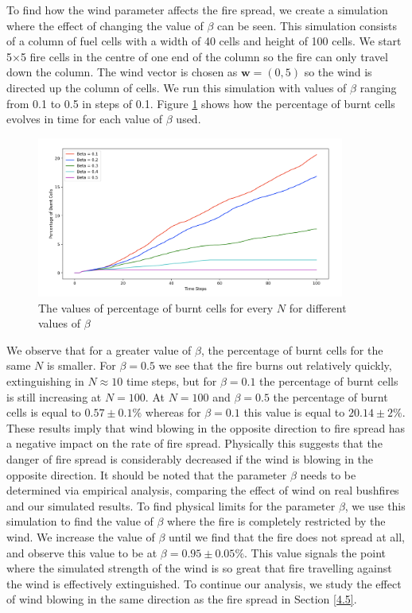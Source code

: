 To find how the wind parameter affects the fire spread, we create a simulation where the effect of changing the value of $\beta$ can be seen. This simulation consists of a column of fuel cells with a width of 40 cells and height of 100 cells. We start 5$\times$5 fire cells in the centre of one end of the column so the fire can only travel down the column. The wind vector is chosen as $\mathbf{w}=(0,5)$ so the wind is directed up the column of cells. We run this simulation with values of $\beta$ ranging from 0.1 to 0.5 in steps of 0.1. Figure \ref{f45} shows how the percentage of burnt cells evolves in time for each value of $\beta$ used.

\begin{figure}[H]
\begin{center}
\includegraphics[width=0.9\textwidth]{Figures/f4.png}\caption{The values of percentage of burnt cells for every $N$ for different values of $\beta$} 
\label{f45}
\end{center}
\end{figure}

\noindent We observe that for a greater value of $\beta$, the percentage of burnt cells for the same $N$ is smaller. For $\beta=0.5$ we see that the fire burns out relatively quickly, extinguishing in $N \approx 10$ time steps, but for $\beta=0.1$ the percentage of burnt cells is still increasing at $N=100$. At $N=100$ and $\beta=0.5$ the percentage of burnt cells is equal to $0.57\pm0.1\%$ whereas for $\beta=0.1$ this value is equal to $20.14\pm2\%$. \newline \indent These results imply that wind blowing in the opposite direction to fire spread has a negative impact on the rate of fire spread. Physically this suggests that the danger of fire spread is considerably decreased if the wind is blowing in the opposite direction. It should be noted that the parameter $\beta$ needs to be determined via empirical analysis, comparing the effect of wind on real bushfires and our simulated results. \newline \indent To find physical limits for the parameter $\beta$, we use this simulation to find the value of $\beta$ where the fire is completely restricted by the wind. We increase the value of $\beta$ until we find that the fire does not spread at all, and observe this value to be at $\beta=0.95\pm0.05\%$. This value signals the point where the simulated strength of the wind is so great that fire travelling against the wind is effectively extinguished. To continue our analysis, we study the effect of wind blowing in the same direction as the fire spread in Section \ref{4.5}.

